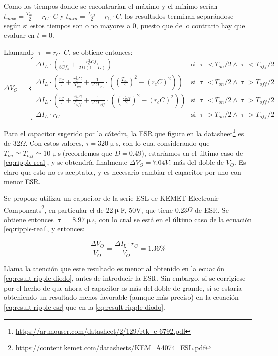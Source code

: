 \documentclass[e4_tp1_main.tex]{subfiles}
\begin{document}
Como los tiempos donde se encontrar\'ian el m\'aximo y el m\'inimo ser\'ian $t_{max} = \frac{T_{on}}{2} - r_C \cdot C$ y $t_{min} = \frac{T_{off}}{2} - r_C \cdot C$, los resultados terminan separ\'andose seg\'un si estos tiempos son o no mayores a 0, puesto que de lo contrario hay que evaluar en $t=0$. 

Llamando $\uptau = r_C \cdot C$, se obtiene entonces:
\begin{equation}
	\Delta V_O =
	\begin{cases} 
		
		\Delta I_L \cdot \left(
			\frac{1}{8Cf_s} + \frac{r_C^2 C f_s}{2D(1-D)}
		\right) 
		& \text{si }  \uptau < T_{on}/2 \wedge \uptau < T_{off}/2 \\
		
		\Delta I_L \cdot \left(
		\frac{r_C}{2} + \frac{r_C^2 C}{T_{on}} + \frac{1}{2CT_{on}} 
		\cdot \left(
			\left( \frac{T_{on}}{2} \right)^2 - (r_c C)^2
		\right)
		\right) 
		& \text{si }  \uptau < T_{on}/2 \wedge \uptau > T_{off}/2\\
		
		\Delta I_L \cdot \left(
		\frac{r_C}{2} + \frac{r_C^2 C}{T_{off}} + \frac{1}{2CT_{off}} 
		\cdot \left(
		\left( \frac{T_{off}}{2} \right)^2 - (r_c C)^2
		\right)
		\right) 
		& \text{si }  
		\uptau < T_{on}/2 \wedge \uptau > T_{off}/2\\
		
		\Delta I_L \cdot r_C & \text{si } \uptau > T_{on}/2 \wedge \uptau > T_{off}/2
		
	\end{cases}
	\label{eq:ripple-real}
\end{equation}

Para el capacitor sugerido por la c\'atedra, la ESR que figura en la datasheet\footnote{ 
	\url{https://ar.mouser.com/datasheet/2/129/rtk_e-6792.pdf}
} es de 32$\Omega$. Con estos valores, $\tau = 320\upmu$s, con lo cual considerando que $T_{on} \simeq T_{off} \simeq 10\upmu$s (recordemos que $D = 0.49$), estar\'iamos en el \'ultimo caso de \ref{eq:ripple-real}, y se obtendr\'ia finalmente $\Delta V_O = 7.04V$: m\'as del doble de $V_O$. Es claro que esto no es aceptable, y es necesario cambiar el capacitor por uno con menor ESR.

Se propone utilizar un capacitor de la serie ESL de KEMET Electronic Components\footnote{
	\url{https://content.kemet.com/datasheets/KEM_A4074_ESL.pdf}
}, en particular el de 22$\upmu$F, 50V, que tiene 0.23$\Omega$ de ESR. Se obtiene entonces $\uptau = 8.97 \upmu$s, con lo cual se est\'a en el \'ultimo caso de la ecuaci\'on \ref{eq:ripple-real}, y entonces:

\begin{equation}
	\frac{\Delta V_O}{V_O} = \frac{\Delta I_L \cdot r_C}{V_O} = 1.36 \%
	\label{eq:result-ripple-esr}
\end{equation}

Llama la atenci\'on que este resultado es menor al obtenido en la ecuaci\'on \ref{eq:result-ripple-diodo}, antes de introducir la ESR. Sin embargo, si se corrigiese por el hecho de que ahora el capacitor es m\'as del doble de grande, s\'i se estar\'ia obteniendo un resultado menos favorable (aunque m\'as preciso) en la ecuaci\'on \ref{eq:result-ripple-esr} que en la  \ref{eq:result-ripple-diodo}.
\end{document}
